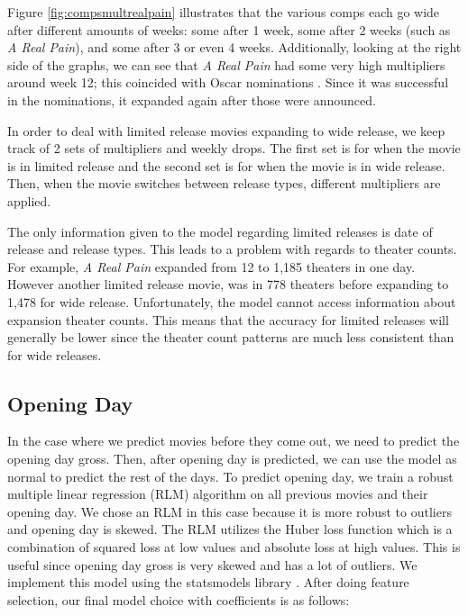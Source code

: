 \documentclass[12pt]{article}
\begin{document}
Figure \ref{fig:compsmultrealpain} illustrates that the various comps each go wide after different amounts of weeks: some after 1 week, some after 2 weeks (such as \textit{A Real Pain}), and some after 3 or even 4 weeks. Additionally, looking at the right side of the graphs, we can see that \textit{A Real Pain} had some very high multipliers around week 12; this coincided with Oscar nominations \citep{realPainNominated}. Since it was successful in the nominations, it expanded again after those were announced.

In order to deal with limited release movies expanding to wide release, we keep track of 2 sets of multipliers and weekly drops. The first set is for when the movie is in limited release and the second set is for when the movie is in wide release. Then, when the movie switches between release types, different multipliers are applied.

The only information given to the model regarding limited releases is date of release and release types. This leads to a problem with regards to theater counts. For example, \textit{A Real Pain} expanded from 12 to 1,185 theaters in one day. However another limited release movie, \cite{holdovers} was in 778 theaters before expanding to 1,478 for wide release. Unfortunately, the model cannot access information about expansion theater counts. This means that the accuracy for limited releases will generally be lower since the theater count patterns are much less consistent than for wide releases.

\subsection{Opening Day}

In the case where we predict movies before they come out, we need to predict the opening day gross. Then, after opening day is predicted, we can use the model as normal to predict the rest of the days.
To predict opening day, we train a robust multiple linear regression (RLM) algorithm on all previous movies and their opening day. We chose an RLM in this case because it is more robust to outliers and opening day is skewed. The RLM utilizes the Huber loss function which is a combination of squared loss at low values and absolute loss at high values. This is useful since opening day gross is very skewed and has a lot of outliers. We implement this model using the statsmodels library \citep{statsmodelsHome}.
After doing feature selection, our final model choice with coefficients is as follows:
\end{document}
